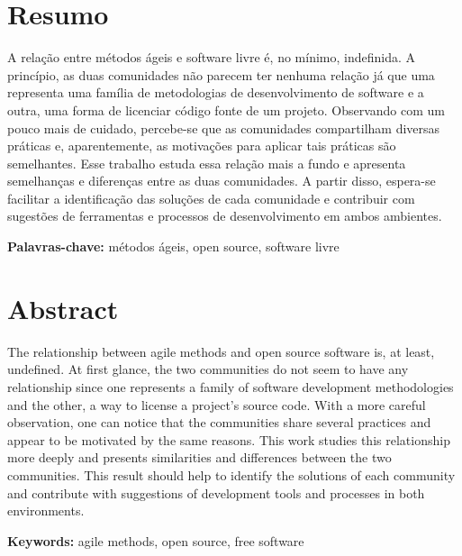 \documentclass[11pt,twoside,a4paper]{book}
\begin{document}
\chapter*{Resumo}

A relação entre métodos ágeis e software livre é, no mínimo,
indefinida. A princípio, as duas comunidades não parecem ter nenhuma
relação já que uma representa uma família de metodologias de
desenvolvimento de software e a outra, uma forma de licenciar código
fonte de um projeto. Observando com um pouco mais de cuidado,
percebe-se que as comunidades compartilham diversas práticas e,
aparentemente, as motivações para aplicar tais práticas são
semelhantes. Esse trabalho estuda essa relação mais a fundo e
apresenta semelhanças e diferenças entre as duas comunidades. A partir
disso, espera-se facilitar a identificação das soluções de cada
comunidade e contribuir com sugestões de ferramentas e processos de
desenvolvimento em ambos ambientes.

\noindent \textbf{Palavras-chave:} métodos ágeis, open source,
software livre

\chapter*{Abstract}

The relationship between agile methods and open source software is, at
least, undefined. At first glance, the two communities do not seem to
have any relationship since one represents a family of software
development methodologies and the other, a way to license a project's
source code. With a more careful observation, one can notice that the
communities share several practices and appear to be motivated by the
same reasons. This work studies this relationship more deeply and
presents similarities and differences between the two
communities. This result should help to identify the solutions of
each community and contribute with suggestions of development tools
and processes in both environments.

\noindent \textbf{Keywords:} agile methods, open source, free software

\tableofcontents %

\end{document}
